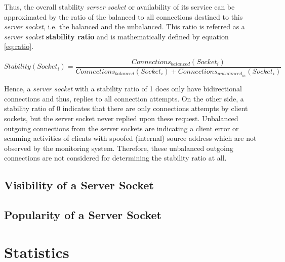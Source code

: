 Thus, the overall stability \emph{server socket} or availability of its service can be approximated by the ratio of the balanced to all connections destined to this \emph{server socket}, i.e. the balanced and the unbalanced. This ratio is referred as a \emph{server socket} \textbf{stability ratio} and is mathematically defined by equation \ref{eq:ratio}.

\begin{equation}
Stability(Socket_i) = \frac{Connections_{balanced}(Socket_i)}{Connections_{balanced}(Socket_i) + Connections_{unbalanced_{in}}(Socket_i)} \label{eq:ratio}
\end{equation}

Hence, a \emph{server socket} with a stability ratio of 1 does only have bidirectional connections and thus, replies to all connection attempts. On the other side, a stability ratio of 0 indicates that there are only connections attempts by client sockets, but the server socket never replied upon these request. Unbalanced outgoing connections from the server sockets are indicating a client error or scanning activities of clients with spoofed (internal) source address which are not observed by the monitoring system. Therefore, these unbalanced outgoing connections are not considered for determining the stability ratio at all.


\subsection{Visibility of a Server Socket}

\subsection{Popularity of a Server Socket}


\section{Statistics}

